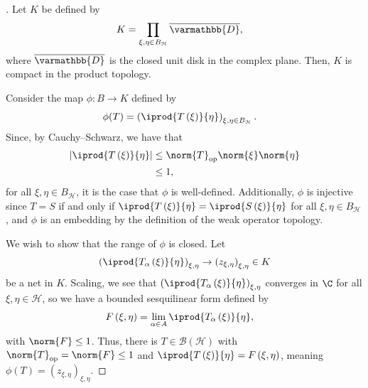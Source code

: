 \documentclass[10pt]{mypackage}
\renewcommand*{\mathbb}[1]{\varmathbb{#1}}
\begin{document}
\begin{proof}[]
  Let $K$ be defined by
  \begin{align*}
    K &= \prod_{\xi,\eta\in B_{\mathcal{H}}}\overline{\mathbb{D}},
  \end{align*}
  where $\overline{\mathbb{D}}$ is the closed unit disk in the complex plane. Then, $K$ is compact in the product topology.\newline

  Consider the map $\phi\colon B\rightarrow K$ defined by
  \begin{align*}
    \phi(T) &= \left( \iprod{T\left(\xi\right)}{\eta}\right)_{\xi,\eta\in B_{\mathcal{H}}}.
  \end{align*}
  Since, by Cauchy--Schwarz, we have that
  \begin{align*}
    \left\vert \iprod{T\left(\xi\right)}{\eta} \right\vert &\leq \norm{T}_{\text{op}}\norm{\xi}\norm{\eta}\\
                                                           &\leq 1,
  \end{align*}
  for all $\xi,\eta\in B_{\mathcal{H}}$, it is the case that $\phi$ is well-defined. Additionally, $\phi$ is injective since $T = S$ if and only if $ \iprod{T\left(\xi\right)}{\eta} = \iprod{S\left(\xi\right)}{\eta} $ for all $\xi,\eta\in B_{\mathcal{H}}$, and $\phi$ is an embedding by the definition of the weak operator topology.\newline

  We wish to show that the range of $\phi$ is closed. Let
  \begin{align*}
    \left( \iprod{T_{\alpha}\left(\xi\right)}{\eta}\right)_{\xi,\eta} \rightarrow \left(z_{\xi,\eta}\right)_{\xi,\eta}\in K
  \end{align*}
  be a net in $K$. Scaling, we see that $\left( \iprod{T_{\alpha}\left(\xi\right)}{\eta}\right)_{\xi,\eta}$ converges in $\C$ for all $\xi,\eta\in \mathcal{H}$, so we have a bounded sesquilinear form defined by
  \begin{align*}
    F\left(\xi,\eta\right) &= \lim_{\alpha \in A} \iprod{T_{\alpha}\left(\xi\right)}{\eta},
  \end{align*}
  with $\norm{F} \leq 1$. Thus, there is $T\in \mathcal{B}\left(\mathcal{H}\right)$ with $\norm{T}_{\text{op}} = \norm{F} \leq 1$ and $ \iprod{T\left(\xi\right)}{\eta} = F\left(\xi,\eta\right) $, meaning $\phi(T) = \left(z_{\xi,\eta}\right)_{\xi,\eta}$.
\end{proof}
\end{document}
